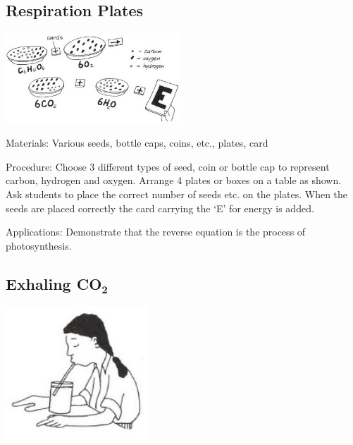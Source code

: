 \begin{multicols}{2}
\subsection{Respiration Plates}

\begin{center}
\includegraphics[width=0.49\textwidth]{./img/vso/respiration-plates.jpg}
\end{center}

\begin{description*}
\item[Materials:]{Various seeds, bottle caps, coins, etc., plates, card}
\item[Procedure:]{Choose 3 different types of seed, coin or bottle cap to represent carbon,
hydrogen and oxygen. Arrange 4 plates or boxes on a table as shown.
Ask students to place the correct number of seeds etc. on the plates.
When the seeds are placed correctly the card carrying the `E' for energy
is added.}
\item[Applications:]{Demonstrate that the reverse equation is the process of
photosynthesis.}
\end{description*}

\subsection{Exhaling \textbf{CO}$_\textbf{2}$} %

\begin{center}
\includegraphics[width=0.4\textwidth]{./img/vso/exhale-co2.jpg}
\end{center}


\end{multicols}
